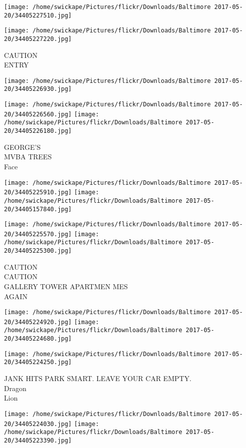 \documentclass[10pt,letterpaper]{article}
\begin{document}
\texttt{[image: /home/swickape/Pictures/flickr/Downloads/Baltimore 2017-05-20/34405227510.jpg]}

\vspace{0.25in}
\texttt{[image: /home/swickape/Pictures/flickr/Downloads/Baltimore 2017-05-20/34405227220.jpg]}

CAUTION\\
ENTRY
\pagebreak

\texttt{[image: /home/swickape/Pictures/flickr/Downloads/Baltimore 2017-05-20/34405226930.jpg]}

\vspace{0.25in}
\texttt{[image: /home/swickape/Pictures/flickr/Downloads/Baltimore 2017-05-20/34405226560.jpg]}
\texttt{[image: /home/swickape/Pictures/flickr/Downloads/Baltimore 2017-05-20/34405226180.jpg]}

GEORGE'S\\
MVBA TREES\\
Face
\pagebreak

\texttt{[image: /home/swickape/Pictures/flickr/Downloads/Baltimore 2017-05-20/34405225910.jpg]}
\texttt{[image: /home/swickape/Pictures/flickr/Downloads/Baltimore 2017-05-20/34405157840.jpg]}

\texttt{[image: /home/swickape/Pictures/flickr/Downloads/Baltimore 2017-05-20/34405225570.jpg]}
\texttt{[image: /home/swickape/Pictures/flickr/Downloads/Baltimore 2017-05-20/34405225300.jpg]}

CAUTION\\
CAUTION\\
GALLERY TOWER APARTMEN MES\\
AGAIN
\pagebreak

\texttt{[image: /home/swickape/Pictures/flickr/Downloads/Baltimore 2017-05-20/34405224920.jpg]}
\texttt{[image: /home/swickape/Pictures/flickr/Downloads/Baltimore 2017-05-20/34405224680.jpg]}

\vspace{0.25in}
\texttt{[image: /home/swickape/Pictures/flickr/Downloads/Baltimore 2017-05-20/34405224250.jpg]}

JANK HITS PARK SMART. LEAVE YOUR CAR EMPTY.\\
Dragon\\
Lion
\pagebreak

\texttt{[image: /home/swickape/Pictures/flickr/Downloads/Baltimore 2017-05-20/34405224030.jpg]}
\texttt{[image: /home/swickape/Pictures/flickr/Downloads/Baltimore 2017-05-20/34405223390.jpg]}
\end{document}
